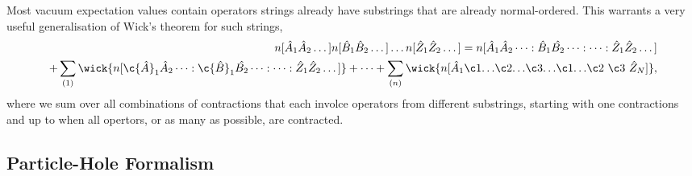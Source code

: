 		Most vacuum expectation values contain operators strings already have substrings
		that are already normal-ordered. This warrants a very useful generalisation of
		Wick's theorem for such strings,
		\begin{equation}
			\begin{aligned}
			n[\hat{A}_1\hat{A}_2 \dots ]
			n[\hat{B}_1\hat{B}_2 \dots ] \dots
			n[\hat{Z}_1\hat{Z}_2 \dots ]
			= n[\hat{A}_1\hat{A}_2\dots:
				\hat{B}_1\hat{B_2}\dots:
				\dots:
				\hat{Z}_1\hat{Z}_2\dots] \\
			+ \sum_{(1)}
				\wick{n[
				\c{\hat{A}}_1\hat{A}_2\dots:
				\c{\hat{B}}_1\hat{B_2}\dots:
				\dots:
				\hat{Z}_1\hat{Z}_2\dots]}
			+ \dots 
			+ \sum_{(n)}
				\wick{n[		
				\hat{A}_1 \c1{\dots} \c2{\dots} \c3{\dots} 
					\c1{\dots} \c2{\ } \c3{\ } \hat{Z}_N
				]},
			\end{aligned}
		\end{equation}
		where we sum over all combinations of contractions that each involce operators 
		from different substrings, starting with one contractions and up to when all
		opertors, or as many as possible, are contracted.

    \subsection{Particle-Hole Formalism}

